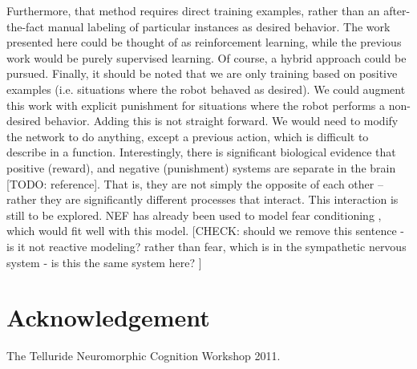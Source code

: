 \documentclass[conference]{IEEEtran}
\begin{document}
Furthermore, that method requires direct training examples, rather than an after-the-fact manual labeling of particular instances as desired behavior. The work presented here could be thought of as reinforcement learning, while the previous work would be purely supervised learning. Of course, a hybrid approach could be pursued. Finally, it should be noted that we are only training based on positive examples (i.e. situations where the robot behaved as desired). We could augment this work with explicit punishment for situations where the robot performs a non-desired behavior. Adding this is not straight forward. We would need to modify the network to do anything, except a previous action, which is difficult to describe in a function. Interestingly, there is significant biological evidence that positive (reward), and negative (punishment) systems are separate in the brain [TODO: reference]. That is, they are not simply the opposite of each other – rather they are significantly different processes that interact. This interaction is still to be explored. NEF has already been used to model fear conditioning \cite{kolbeck2013fear}, which would fit well with this model.  [CHECK: should we remove this sentence - is it not reactive modeling? rather than  fear, which is in the sympathetic nervous system - is this the same system here? ] 



\section*{Acknowledgement}

The Telluride Neuromorphic Cognition Workshop 2011. 




\end{document}
